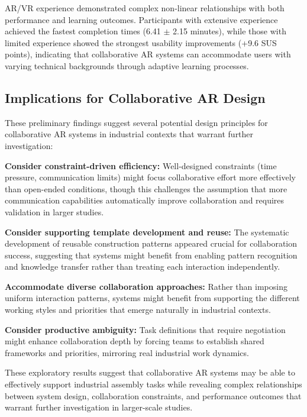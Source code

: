 AR/VR experience demonstrated complex non-linear relationships with both performance and learning outcomes. Participants with extensive experience achieved the fastest completion times (6.41 $\pm$ 2.15 minutes), while those with limited experience showed the strongest usability improvements (+9.6 SUS points), indicating that collaborative AR systems can accommodate users with varying technical backgrounds through adaptive learning processes.

\subsection{Implications for Collaborative AR Design}
These preliminary findings suggest several potential design principles for collaborative AR systems in industrial contexts that warrant further investigation:

\textbf{Consider constraint-driven efficiency:} Well-designed constraints (time pressure, communication limits) might focus collaborative effort more effectively than open-ended conditions, though this challenges the assumption that more communication capabilities automatically improve collaboration and requires validation in larger studies.

\textbf{Consider supporting template development and reuse:} The systematic development of reusable construction patterns appeared crucial for collaboration success, suggesting that systems might benefit from enabling pattern recognition and knowledge transfer rather than treating each interaction independently.

\textbf{Accommodate diverse collaboration approaches:} Rather than imposing uniform interaction patterns, systems might benefit from supporting the different working styles and priorities that emerge naturally in industrial contexts.

\textbf{Consider productive ambiguity:} Task definitions that require negotiation might enhance collaboration depth by forcing teams to establish shared frameworks and priorities, mirroring real industrial work dynamics.

These exploratory results suggest that collaborative AR systems may be able to effectively support industrial assembly tasks while revealing complex relationships between system design, collaboration constraints, and performance outcomes that warrant further investigation in larger-scale studies.
